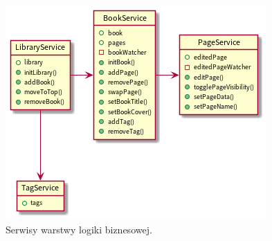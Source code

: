 \begin{figure}[H]
	\begin{center}
		\includegraphics[scale=0.9]{media/LogicLayer.png}
	\end{center}
	\caption{Serwisy warstwy logiki biznesowej.}
	\label{rys:logic-layer}
\end{figure}

